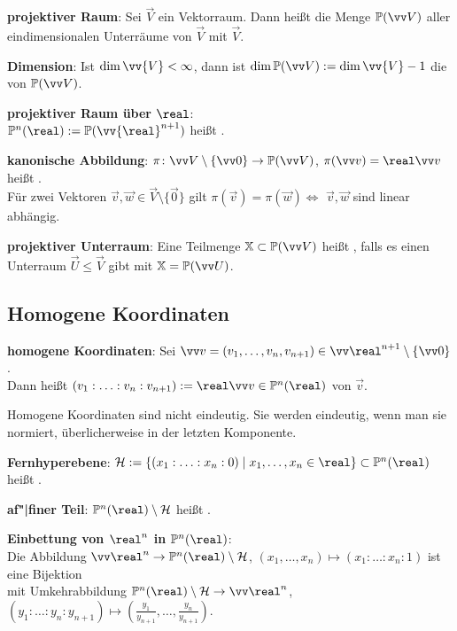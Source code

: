 \textbf{projektiver Raum}:
Sei $\vec{V}$ ein Vektorraum.
Dann heißt die Menge $\PP(\vec{V})$ aller eindimensionalen Unterräume von $\vec{V}$
 mit  $\vec{V}$.

\textbf{Dimension}:
Ist $\dim \vv{V} < \infty$, dann ist $\dim \PP(\vec{V}) := \dim \vv{V} - 1$ die
 von $\PP(\vec{V})$.

\textbf{projektiver Raum über $\real$}:\\
$\PP^n(\real) := \PP(\vv{\real}^{n+1})$ heißt
.

\textbf{kanonische Abbildung}:
$\pi\colon \vec{V} \setminus \{\vec{0}\} \to \PP(\vec{V})$, $\pi(\vec{v}) = \real\vec{v}$
heißt .\\
Für zwei Vektoren $\vec{v}, \vec{w} \in \vec{V} \setminus \{\vec{0}\}$ gilt
$\pi(\vec{v}) = \pi(\vec{w}) \iff$ $\vec{v}, \vec{w}$ sind linear abhängig.

\textbf{projektiver Unterraum}:
Eine Teilmenge $\XX \subset \PP(\vec{V})$ heißt ,
falls es einen Unterraum $\vec{U} \le \vec{V}$ gibt mit $\XX = \PP(\vec{U})$.

\subsection{%
    Homogene Koordinaten%
}

\textbf{homogene Koordinaten}:
Sei $\vec{v} = (v_1, \dotsc, v_n, v_{n+1}) \in \vec{\real}^{n+1} \setminus \{\vec{0}\}$.\\
Dann heißt $(v_1 : \dotsc : v_n : v_{n+1}) := \real\vec{v} \in \PP^n(\real)$
 von $\vec{v}$.

Homogene Koordinaten sind nicht eindeutig.
Sie werden eindeutig, wenn man sie normiert,
überlicherweise in der letzten Komponente.

\textbf{Fernhyperebene}:
$\H := \{(x_1 : \dotsc : x_n : 0) \;|\; x_1, \dotsc, x_n \in \real\} \subset \PP^n(\real)$
heißt .

\textbf{af"|finer Teil}:
$\PP^n(\real) \setminus \H$ heißt .

\textbf{Einbettung von $\real^n$ in $\PP^n(\real)$}:\\
Die Abbildung
$\vec{\real}^n \to \PP^n(\real) \setminus \H$,
$(x_1, \dotsc, x_n) \mapsto (x_1 : \dotsc : x_n : 1)$
ist eine Bijektion\\
mit Umkehrabbildung
$\PP^n(\real) \setminus \H \to \vec{\real}^n$,
$(y_1 : \dotsc : y_n : y_{n+1}) \mapsto (\frac{y_1}{y_{n+1}}, \dotsc, \frac{y_n}{y_{n+1}})$.

